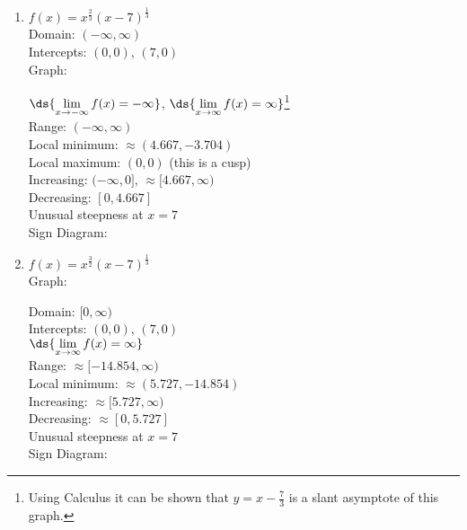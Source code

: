 \documentclass{ximera}
\begin{document}
\begin{enumerate}
\setcounter{enumi}{\value{HW}}

\item \begin{multicols}{2} 
$f(x) = x^{\frac{2}{3}}(x - 7)^{\frac{1}{3}}$\\
Domain: $(-\infty, \infty)$\\
Intercepts: $(0,0)$, $(7,0)$\\
Graph: \\




\vfill
\columnbreak

$\ds{\lim_{x \rightarrow - \infty} f(x) = - \infty}$, $\ds{\lim_{x \rightarrow \infty} f(x) = \infty}$\footnote{Using Calculus it can be shown that $y = x - \frac{7}{3}$ is a slant asymptote of this graph.}\\
Range: $(-\infty, \infty)$\\
Local minimum: $\approx (4.667, -3.704)$\\
Local maximum: $(0,0)$ (this is a cusp) \\
Increasing: $(-\infty, 0]$, $\approx [4.667, \infty)$\\
Decreasing: $[0, 4.667]$\\
Unusual steepness at $x = 7$\\

Sign Diagram:\\

\smallskip






\end{multicols}

\item \begin{multicols}{2} 
$f(x) = x^{\frac{3}{2}}(x - 7)^{\frac{1}{3}}$\\
Graph: \\




\vfill
\columnbreak

Domain: $[0, \infty)$\\
Intercepts: $(0,0)$, $(7,0)$\\
$\ds{\lim_{x \rightarrow \infty} f(x) = \infty}$\\
Range:  $\approx [-14.854, \infty)$\\
Local minimum:  $\approx (5.727, -14.854)$\\
Increasing: $\approx [5.727, \infty)$\\
Decreasing: $\approx [0, 5.727]$\\
Unusual steepness at $x = 7$\\
Sign Diagram:\\

\smallskip





\end{multicols}

\setcounter{HW}{\value{enumi}}
\end{enumerate}
\end{document}
